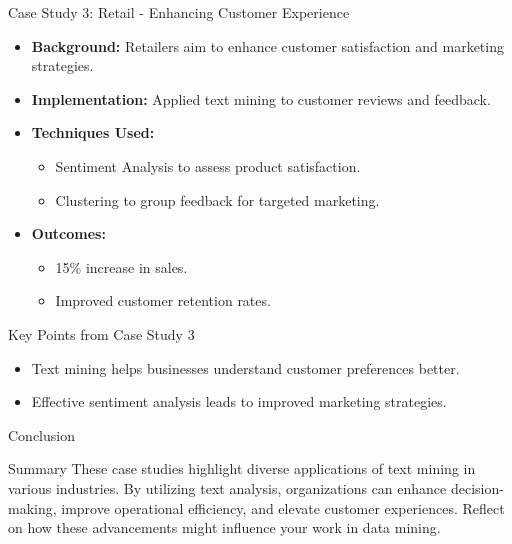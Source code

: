 \documentclass[aspectratio=169]{beamer}
\begin{document}
\begin{frame}[fragile]{Case Study 3: Retail - Enhancing Customer Experience}
    \begin{itemize}
        \item \textbf{Background:} Retailers aim to enhance customer satisfaction and marketing strategies.
        \item \textbf{Implementation:} Applied text mining to customer reviews and feedback.
        \item \textbf{Techniques Used:} 
        \begin{itemize}
            \item Sentiment Analysis to assess product satisfaction.
            \item Clustering to group feedback for targeted marketing.
        \end{itemize}
        \item \textbf{Outcomes:} 
        \begin{itemize}
            \item 15\% increase in sales.
            \item Improved customer retention rates.
        \end{itemize}
    \end{itemize}
\end{frame}

\begin{frame}[fragile]{Key Points from Case Study 3}
    \begin{itemize}
        \item Text mining helps businesses understand customer preferences better.
        \item Effective sentiment analysis leads to improved marketing strategies.
    \end{itemize}
\end{frame}

\begin{frame}[fragile]{Conclusion}
    \begin{block}{Summary}
        These case studies highlight diverse applications of text mining in various industries. By utilizing text analysis, organizations can enhance decision-making, improve operational efficiency, and elevate customer experiences. Reflect on how these advancements might influence your work in data mining.
    \end{block}
\end{frame}
\end{document}
